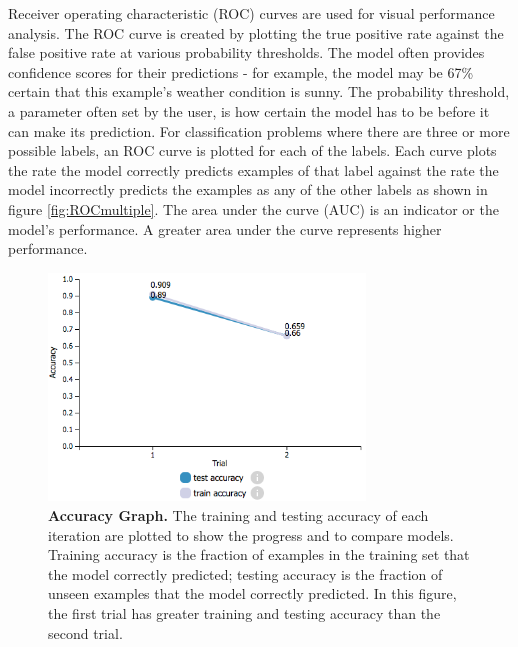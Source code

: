 Receiver operating characteristic (ROC) curves are used for visual performance analysis. The ROC curve is created by plotting the true positive rate against the false positive rate at various probability thresholds. The model often provides confidence scores for their predictions - for example, the model may be 67\% certain that this example's weather condition is sunny. The probability threshold, a parameter often set by the user, is how certain the model has to be before it can make its prediction. 
For classification problems where there are three or more possible labels, an ROC curve is plotted for each of the labels. Each curve plots the rate the model correctly predicts examples of that label against the rate the model incorrectly predicts the examples as any of the other labels as shown in figure \ref{fig:ROCmultiple}. The area under the curve (AUC) is an indicator or the model's performance. A greater area under the curve represents higher performance. 

\begin{figure}[!htbp]
\centering
\includegraphics[width=0.75\textwidth]{accuracy}
\caption{\textbf{Accuracy Graph.} The training and testing accuracy of each iteration are plotted to show the progress and to compare models. Training accuracy is the fraction of examples in the training set that the model correctly predicted; testing accuracy is the fraction of unseen examples that the model correctly predicted. In this figure, the first trial has greater training and testing accuracy than the second trial. } \label{fig:accuracy}
\end{figure}

